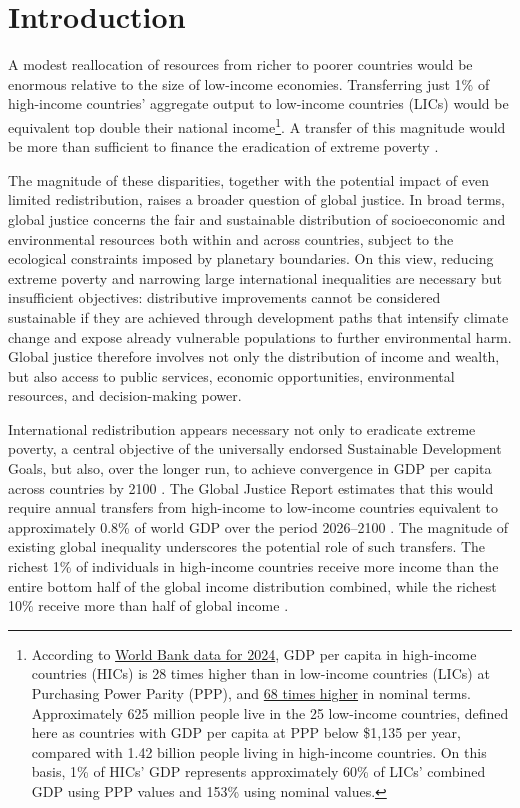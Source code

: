 \section*{Introduction}

A modest reallocation of resources from richer to poorer countries would be enormous relative to the size of low-income economies. Transferring just 1\% of high-income countries' aggregate output to low-income countries (LICs) would be equivalent top double their national income\footnote{According to \href{https://data.worldbank.org/indicator/NY.GDP.PCAP.PP.CD?contextual=default&end=2024&locations=EU-ZG-XD-XM-1W-IN-US-CD-BI-LU-CN&start=2024&view=bar}{World Bank data for 2024}, GDP per capita in high-income countries (HICs) is 28 times higher than in low-income countries (LICs) at Purchasing Power Parity (PPP), and \href{https://data.worldbank.org/indicator/NY.GDP.PCAP.CD?end=2024&locations=EU-ZG-XD-XM-1W-IN-US-CD-BI-LU-CN&start=2024&view=bar}{68 times higher} in nominal terms. Approximately 625 million people live in the 25 low-income countries, defined here as countries with GDP per capita at PPP below \$1,135 per year, compared with 1.42 billion people living in high-income countries. On this basis, 1\% of HICs' GDP represents approximately 60\% of LICs' combined GDP using PPP values and 153\% using nominal values.}. A transfer of this magnitude would be more than sufficient to finance the eradication of extreme poverty \citep{sahoo_what_2025}.

The magnitude of these disparities, together with the potential impact of even limited redistribution, raises a broader question of global justice. In broad terms, global justice concerns the fair and sustainable distribution of socioeconomic and environmental resources both within and across countries, subject to the ecological constraints imposed by planetary boundaries. On this view, reducing extreme poverty and narrowing large international inequalities are necessary but insufficient objectives: distributive improvements cannot be considered sustainable if they are achieved through development paths that intensify climate change and expose already vulnerable populations to further environmental harm. Global justice therefore involves not only the distribution of income and wealth, but also access to public services, economic opportunities, environmental resources, and decision-making power.

International redistribution appears necessary not only to eradicate extreme poverty, a central objective of the universally endorsed Sustainable Development Goals, but also, over the longer run, to achieve convergence in GDP per capita across countries by 2100 \citep{fabre_JDS_2025}. The Global Justice Report estimates that this would require annual transfers from high-income to low-income countries equivalent to approximately 0.8\% of world GDP over the period 2026--2100 \citep[Figure~4.2]{bothe_et_al_2026}. The magnitude of existing global inequality underscores the potential role of such transfers. The richest 1\% of individuals in high-income countries receive more income than the entire bottom half of the global income distribution combined, while the richest 10\% receive more than half of global income \citep{chancel_world_2026}.


